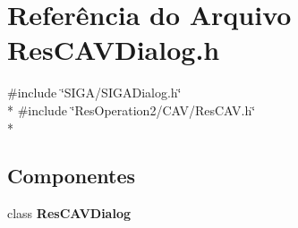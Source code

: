 \section{Referência do Arquivo Res\+C\+A\+V\+Dialog.\+h}
\label{_2_c_a_v_2_res_c_a_v_dialog_8h}
{\ttfamily \#include \char`\"{}S\+I\+G\+A/\+S\+I\+G\+A\+Dialog.\+h\char`\"{}}\\*
{\ttfamily \#include \char`\"{}Res\+Operation2/\+C\+A\+V/\+Res\+C\+A\+V.\+h\char`\"{}}\\*
\subsection*{Componentes}
\begin{DoxyCompactItemize}
\item 
class {\bf Res\+C\+A\+V\+Dialog}
\end{DoxyCompactItemize}
